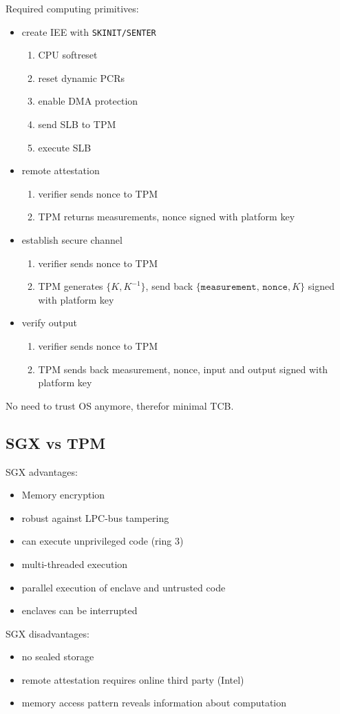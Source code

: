Required computing primitives:
\begin{itemize}
    \item create IEE with \texttt{SKINIT/SENTER}
        \begin{enumerate}
            \item CPU softreset
            \item reset dynamic PCRs
            \item enable DMA protection
            \item send SLB to TPM
            \item execute SLB
        \end{enumerate}
    \item remote attestation
        \begin{enumerate}
            \item verifier sends nonce to TPM
            \item TPM returns measurements, nonce signed with platform key
        \end{enumerate}
    \item establish secure channel
        \begin{enumerate}
            \item verifier sends nonce to TPM
            \item TPM generates $\{K, K^{-1}\}$, send back $\{\texttt{measurement, nonce}, K\}$ signed with platform key
        \end{enumerate}
    \item verify output
        \begin{enumerate}
            \item verifier sends nonce to TPM
            \item TPM sends back measurement, nonce, input and output signed with platform key
        \end{enumerate}
\end{itemize}

No need to trust OS anymore, therefor minimal TCB.

\subsection{SGX vs TPM}
SGX advantages:
\begin{itemize}
    \item Memory encryption
    \item robust against LPC-bus tampering
    \item can execute unprivileged code (ring 3)
    \item multi-threaded execution
    \item parallel execution of enclave and untrusted code
    \item enclaves can be interrupted
\end{itemize}

SGX disadvantages:
\begin{itemize}
    \item no sealed storage
    \item remote attestation requires online third party (Intel)
    \item memory access pattern reveals information about computation
\end{itemize}

